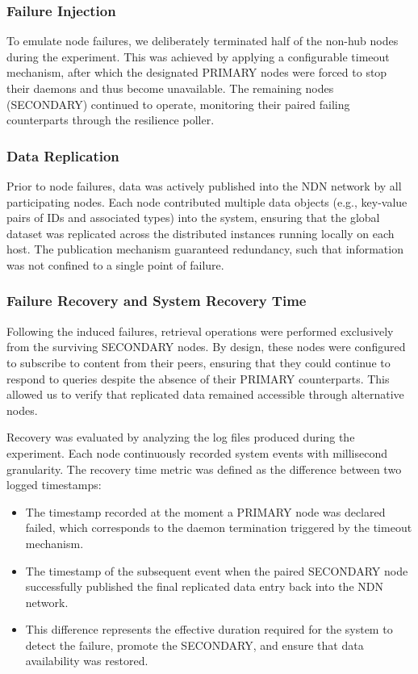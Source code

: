 \documentclass{article}
\begin{document}
\subsubsection{Failure Injection}

To emulate node failures, we deliberately terminated half of the non-hub nodes during the experiment. This was achieved by applying a configurable timeout mechanism, after which the designated PRIMARY nodes were forced to stop their daemons and thus become unavailable. The remaining nodes (SECONDARY) continued to operate, monitoring their paired failing counterparts through the resilience poller.

\subsubsection{Data Replication}

Prior to node failures, data was actively published into the NDN network by all participating nodes. Each node contributed multiple data objects (e.g., key-value pairs of IDs and associated types) into the system, ensuring that the global dataset was replicated across the distributed instances running locally on each host. The publication mechanism guaranteed redundancy, such that information was not confined to a single point of failure.

\subsubsection{Failure Recovery and System Recovery Time}

Following the induced failures, retrieval operations were performed exclusively from the surviving SECONDARY nodes. By design, these nodes were configured to subscribe to content from their peers, ensuring that they could continue to respond to queries despite the absence of their PRIMARY counterparts. This allowed us to verify that replicated data remained accessible through alternative nodes.

Recovery was evaluated by analyzing the log files produced during the experiment. Each node continuously recorded system events with millisecond granularity. The recovery time metric was defined as the difference between two logged timestamps:

\begin{itemize}
    \item The timestamp recorded at the moment a PRIMARY node was declared failed, which corresponds to the daemon termination triggered by the timeout mechanism.
    \item The timestamp of the subsequent event when the paired SECONDARY node successfully published the final replicated data entry back into the NDN network.
    \item This difference represents the effective duration required for the system to detect the failure, promote the SECONDARY, and ensure that data availability was restored.
\end{itemize}
\end{document}
